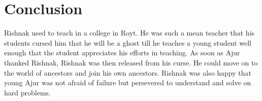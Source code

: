 \chapter{Conclusion}
 Rishnak used to teach in a college in Royt. He was such a mean 
teacher that his students cursed him that he will be a ghost till he teaches a young student well enough that the student
appreciates his efforts in teaching. As soon as Ajur thanked Rishnak, Rishnak was then released from his curse. He could move on to the world of ancestors and join his own ancestors. Rishnak was also happy that young Ajur was not afraid of failure but persevered to understand and solve on hard problems.
